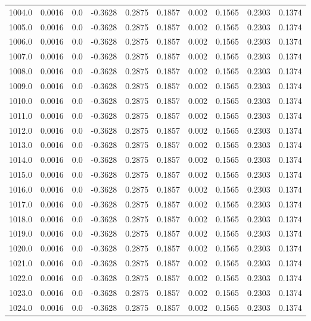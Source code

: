 \begin{longtable}{lrrrrrrrrr}
1004.0 & 0.0016 & 0.0 & -0.3628 & 0.2875 & 0.1857 & 0.002 & 0.1565 & 0.2303 & 0.1374 \\
1005.0 & 0.0016 & 0.0 & -0.3628 & 0.2875 & 0.1857 & 0.002 & 0.1565 & 0.2303 & 0.1374 \\
1006.0 & 0.0016 & 0.0 & -0.3628 & 0.2875 & 0.1857 & 0.002 & 0.1565 & 0.2303 & 0.1374 \\
1007.0 & 0.0016 & 0.0 & -0.3628 & 0.2875 & 0.1857 & 0.002 & 0.1565 & 0.2303 & 0.1374 \\
1008.0 & 0.0016 & 0.0 & -0.3628 & 0.2875 & 0.1857 & 0.002 & 0.1565 & 0.2303 & 0.1374 \\
1009.0 & 0.0016 & 0.0 & -0.3628 & 0.2875 & 0.1857 & 0.002 & 0.1565 & 0.2303 & 0.1374 \\
1010.0 & 0.0016 & 0.0 & -0.3628 & 0.2875 & 0.1857 & 0.002 & 0.1565 & 0.2303 & 0.1374 \\
1011.0 & 0.0016 & 0.0 & -0.3628 & 0.2875 & 0.1857 & 0.002 & 0.1565 & 0.2303 & 0.1374 \\
1012.0 & 0.0016 & 0.0 & -0.3628 & 0.2875 & 0.1857 & 0.002 & 0.1565 & 0.2303 & 0.1374 \\
1013.0 & 0.0016 & 0.0 & -0.3628 & 0.2875 & 0.1857 & 0.002 & 0.1565 & 0.2303 & 0.1374 \\
1014.0 & 0.0016 & 0.0 & -0.3628 & 0.2875 & 0.1857 & 0.002 & 0.1565 & 0.2303 & 0.1374 \\
1015.0 & 0.0016 & 0.0 & -0.3628 & 0.2875 & 0.1857 & 0.002 & 0.1565 & 0.2303 & 0.1374 \\
1016.0 & 0.0016 & 0.0 & -0.3628 & 0.2875 & 0.1857 & 0.002 & 0.1565 & 0.2303 & 0.1374 \\
1017.0 & 0.0016 & 0.0 & -0.3628 & 0.2875 & 0.1857 & 0.002 & 0.1565 & 0.2303 & 0.1374 \\
1018.0 & 0.0016 & 0.0 & -0.3628 & 0.2875 & 0.1857 & 0.002 & 0.1565 & 0.2303 & 0.1374 \\
1019.0 & 0.0016 & 0.0 & -0.3628 & 0.2875 & 0.1857 & 0.002 & 0.1565 & 0.2303 & 0.1374 \\
1020.0 & 0.0016 & 0.0 & -0.3628 & 0.2875 & 0.1857 & 0.002 & 0.1565 & 0.2303 & 0.1374 \\
1021.0 & 0.0016 & 0.0 & -0.3628 & 0.2875 & 0.1857 & 0.002 & 0.1565 & 0.2303 & 0.1374 \\
1022.0 & 0.0016 & 0.0 & -0.3628 & 0.2875 & 0.1857 & 0.002 & 0.1565 & 0.2303 & 0.1374 \\
1023.0 & 0.0016 & 0.0 & -0.3628 & 0.2875 & 0.1857 & 0.002 & 0.1565 & 0.2303 & 0.1374 \\
1024.0 & 0.0016 & 0.0 & -0.3628 & 0.2875 & 0.1857 & 0.002 & 0.1565 & 0.2303 & 0.1374 \\

\end{longtable}
